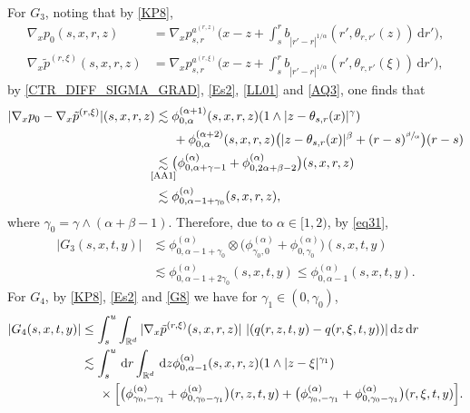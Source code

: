 \documentclass[JEP,XML,SOM,Unicode,published]{cedram}
\newcommand{\sm}[1]{\makebox[0pt][c]{\scriptsize#1}}
\theoremstyle{plain}
\theoremstyle{definition}
\newcommand\mR{\mathbb{R}}
\newcommand\1{{\mathbf{1}}}
\newcommand{\dif}{\,\mathrm{d}}
\begin{document}
For $G_3$, noting that by \eqref{KP8},
\begin{align*}
\nabla_x {p}_0(s,x,r,z)&=\nabla_x {p}^{a^{(r,z)}}_{s,r}\biggl(x-z+\int^r_s b_{|r'-r|^{1/\alpha}}(r',\theta_{r,r'}(z))\dif r'\biggr),\\
\nabla_x \tilde{p}^{({r},\xi)}(s,x,r,z)&=\nabla_x {p}^{a^{(r,\xi)}}_{s,r}\biggl(x-z+\int^r_s b_{|r'-r|^{1/\alpha}}(r',\theta_{r,r'}(\xi))\dif r'\biggr),
\end{align*}
by \eqref{CTR_DIFF_SIGMA_GRAD}, \eqref{Es2}, \eqref{LL01} and \eqref{AQ3}, one finds that
\begin{align*}%
|\nabla_x {p}_0-\nabla_x \tilde{p}^{(r,\xi)}|(s,x,r,z)
&\lesssim\phi_{0,\alpha}^{(\alpha+1)}(s,x,r,z) (1\wedge |z-\theta_{s,r}(x)|^\gamma)\\
&\hspace*{.5cm}+\phi_{0,\alpha}^{(\alpha+2)}(s,x,r,z)\bigl(|z-\theta_{s,r}(x)|^\beta+(r-s)^{\sfrac{\beta}{\alpha}}\bigr)(r-s)\\
&\underset{\sm{\eqref{AA1}}}{\lesssim}\bigl(\phi_{0,\alpha+\gamma-1}^{(\alpha)}+\phi_{0,2\alpha+\beta-2}^{(\alpha)}\bigr)(s,x,r,z)\\
&\lesssim\phi_{0,\alpha-1+\gamma_0}^{(\alpha)}(s,x,r,z),
\end{align*}
where $\gamma_0=\gamma\wedge(\alpha+\beta-1)$.
Therefore, due to $\alpha\in[1,2)$, by \eqref{eq31},
\begin{equation}
\begin{aligned}\label{CTR_SECOND_SUMMAND}
|G_3(s,x,t,y)|&\lesssim
\phi_{0,\alpha-1+\gamma_0}^{(\alpha)}\otimes
\bigl(\phi_{\gamma_0,0}^{(\alpha)} +\phi_{0,\gamma_0}^{(\alpha)}\bigr)(s,x,t,y)\\
&\lesssim\phi_{0,\alpha-1+2\gamma_0}^{(\alpha)}(s,x,t,y)
\leq\phi_{0,\alpha-1}^{(\alpha)}(s,x,t,y).
\end{aligned}
\end{equation}
For $G_4$, by \eqref{KP8}, \eqref{Es2}
and \eqref{G8} we have for $\gamma_1\in(0,\gamma_0)$,
\begin{align*}
|G_4(s,x,t,y)|
&\le \int_s^u\int_{\mR^d}|\nabla_x\tilde{p}^{(r,\xi)}(s,x,r,z)|\ |(q(r,z,t,y)-q(r,\xi,t,y))|\dif z \dif r\\
&\lesssim \int_s^u\dif r\int_{\mR^d} \dif z \phi_{0,\alpha-1}^{(\alpha)}(s,x,r,z)(1\wedge |z-\xi|^{\gamma_1})\\
&\hspace*{.5cm}\times\Big[\bigl(\phi^{(\alpha)}_{\gamma_0,-\gamma_1}+\phi^{(\alpha)}_{0,\gamma_0-\gamma_1}\bigr)(r,z,t,y)
+\bigl(\phi^{(\alpha)}_{\gamma_0,-\gamma_1}+\phi^{(\alpha)}_{0,\gamma_0-\gamma_1}\bigr)(r,\xi,t,y)\Big].
\end{align*}
\end{document}
